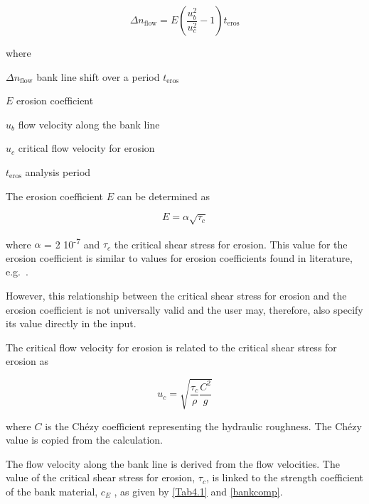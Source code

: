 \begin{equation}
\Delta n_\text{flow} = E \left ( \frac{u_b^2}{u_c^2} - 1 \right ) t_\text{eros}
\end{equation}

where

\begin{symbollist}
\item[$\Delta n_\text{flow}$] bank line shift over a period $t_\text{eros}$ 
\item[$E$] erosion coefficient 
\item[$u_b$] flow velocity along the bank line 
\item[$u_c$] critical flow velocity for erosion 
\item[$t_\text{eros}$] analysis period 
\end{symbollist}

The erosion coefficient $E$ can be determined as

\begin{equation}
E = \alpha \sqrt{\tau_c}
\end{equation}

where $\alpha$ = 2 10\textsuperscript{-7}  and $\tau_c$  the critical shear stress for erosion.
This value for the erosion coefficient is similar to values for erosion coefficients found in literature, e.g.~\citet{Crosato07}.

However, this relationship between the critical shear stress for erosion and the erosion coefficient is not universally valid and the user may, therefore, also specify its value directly in the input.

The critical flow velocity for erosion is related to the critical shear stress for erosion as

\begin{equation}
u_c = \sqrt{\frac{\tau_c}{\rho} \frac{C^2}{g}}
\end{equation}

where $C$  is the Ch\'ezy coefficient representing the hydraulic roughness.
The Ch\'ezy value is copied from the \dflowfm calculation.

The flow velocity along the bank line is derived from the \dflowfm flow velocities.
The value of the critical shear stress for erosion, $\tau_c$, is linked to the strength coefficient of the bank material, $c_E$ , as given by \autoref{Tab4.1} and \autoref{bankcomp}.

